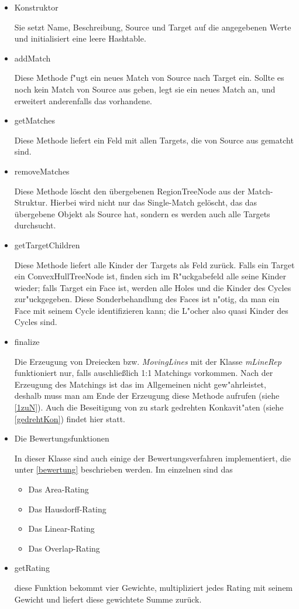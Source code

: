 \begin{itemize}

\item Konstruktor

Sie setzt Name, Beschreibung, Source und Target auf die angegebenen Werte und initialisiert eine leere Hashtable.

\item addMatch

Diese Methode f"ugt ein neues Match von Source nach Target ein. Sollte es noch kein Match von Source aus geben, legt sie ein neues Match an, und erweitert anderenfalls das vorhandene.

\item getMatches

Diese Methode liefert ein Feld mit allen Targets, die von Source aus gematcht sind.

\item removeMatches

Diese Methode löscht den übergebenen RegionTreeNode aus der Match-Struktur. Hierbei wird nicht nur das Single-Match gelöscht, das das übergebene Objekt als Source hat, sondern es werden auch alle Targets durchsucht.

\item getTargetChildren

Diese Methode liefert alle Kinder der Targets als Feld zurück. Falls ein Target ein ConvexHullTreeNode ist, finden sich im R"uckgabefeld alle seine Kinder  wieder; falls Target ein Face ist, werden alle Holes und die Kinder des Cycles zur"uckgegeben. Diese Sonderbehandlung des Faces ist n"otig, da man ein Face mit seinem Cycle identifizieren kann; die L"ocher also quasi Kinder des Cycles sind.

\item finalize

Die Erzeugung von Dreiecken bzw. \textit{MovingLines} mit der Klasse \textit{mLineRep} funktioniert nur, falls auschließlich 1:1 Matchings vorkommen. Nach der Erzeugung des Matchings ist das im Allgemeinen nicht gew"ahrleistet, deshalb muss man am Ende der Erzeugung diese Methode aufrufen  (siehe \vref{1zuN}). Auch die Beseitigung von zu stark gedrehten Konkavit"aten (siehe \vref{gedrehtKon}) findet hier statt.

\item Die Bewertungsfunktionen

In dieser Klasse sind auch einige der Bewertungsverfahren implementiert, die unter \vref{bewertung} beschrieben werden. Im einzelnen sind das
\begin{itemize}
\item Das Area-Rating
\item Das Hausdorff-Rating
\item Das Linear-Rating
\item Das Overlap-Rating
\end{itemize}

\item getRating

diese Funktion bekommt vier Gewichte, multipliziert jedes Rating mit seinem Gewicht und liefert diese gewichtete Summe zurück.

\end{itemize}


